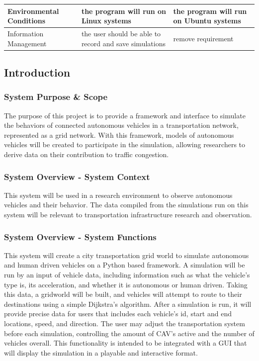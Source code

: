 \documentclass[onecolumn, draftclsnofoot,10pt, compsoc]{IEEEtran}
\begin{document}
\begin{table}[h]
\begin{tabular}{|l|p{2in}|p{2in}|}
Environmental Conditions & the program will run on Linux systems                                                                                  & the program will run on Ubuntu systems                                                                                         \\ \hline
Information Management   & the user should be able to record and save simulations                                                                 & remove requirement                                                                                                             \\ \hline
\end{tabular}
\end{table}
\subsection{Introduction}
\subsubsection{System Purpose \& Scope}
The purpose of this project is to provide a framework and interface to simulate the behaviors of connected autonomous vehicles in a transportation network, represented as a grid network.
With this framework, models of autonomous vehicles will be created to participate in the simulation, allowing researchers to derive data on their contribution to traffic congestion.
\subsubsection{System Overview - System Context}
This system will be used in a research environment to observe autonomous vehicles and their behavior.
The data compiled from the simulations run on this system will be relevant to transportation infrastructure research and observation.
\subsubsection{System Overview - System Functions}
This system will create a city transportation grid world to simulate autonomous and human driven vehicles on a Python based framework.
A simulation will be run by an input of vehicle data, including information such as what the vehicle’s type is, its acceleration, and whether it is autonomous or human driven.
Taking this data, a gridworld will be built, and vehicles will attempt to route to their destinations using a simple Dijkstra’s algorithm.
After a simulation is run, it will provide precise data for users that includes each vehicle's id, start and end locations, speed, and direction.
The user may adjust the transportation system before each simulation, controlling the amount of CAV’s active and the number of vehicles overall.
This functionality is intended to be integrated with a GUI that will display the simulation in a playable and interactive format.
\end{document}

